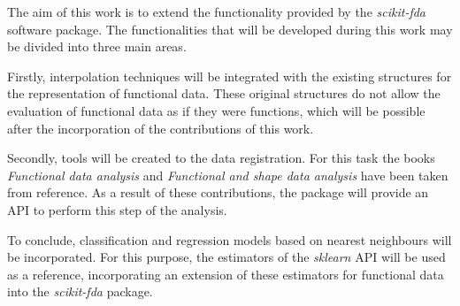 

The aim of this work is to extend the functionality provided by the
\textit{scikit-fda} software package. The functionalities that will
be developed during this work may be divided into three main areas.

Firstly, interpolation techniques will be integrated with the existing
structures for the representation of functional data. These original structures
do not allow the evaluation of functional data as if they were functions,
which will be possible after the incorporation of the contributions of this work.

Secondly, tools will be created to the data registration. For this task
the books \textit{Functional data analysis}\cite{Ramsay2005} and
\textit{Functional and shape data analysis}\cite{Srivastava2016} have been taken from
reference. As a result of these contributions, the package will provide an \acs{API}
to perform this step of the analysis.

To conclude, classification and regression models based on nearest neighbours
will be incorporated. For this purpose,
the estimators of the \textit{sklearn}\cite{sklearn} \acs{API} will be used as a reference,
incorporating an extension of these estimators for functional data
into the \textit{scikit-fda} package.
